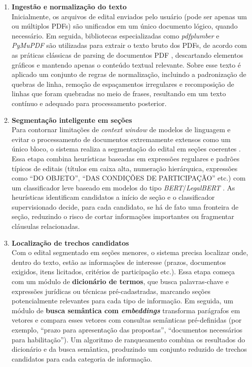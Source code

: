 \begin{enumerate}
    \item \textbf{Ingestão e normalização do texto}\\
    Inicialmente, os arquivos de edital enviados pelo usuário (pode ser apenas um ou múltiplos PDFs) são unificados em um único documento lógico, quando necessário. Em seguida, bibliotecas especializadas como \textit{pdfplumber} e \textit{PyMuPDF} são utilizadas para extrair o texto bruto dos PDFs, de acordo com as práticas clássicas de parsing de documentos PDF \cite{hassan2016pdfparsing}, descartando elementos gráficos e mantendo apenas o conteúdo textual relevante. Sobre esse texto é aplicado um conjunto de regras de normalização, incluindo a padronização de quebras de linha, remoção de espaçamentos irregulares e recomposição de linhas que foram quebradas no meio de frases, resultando em um texto contínuo e adequado para processamento posterior.

    \item \textbf{Segmentação inteligente em seções}\\
    Para contornar limitações de \textit{context window} de modelos de linguagem \cite{beltagy2020longformer} e evitar o processamento de documentos extremamente extensos como um único bloco, o sistema realiza a segmentação do edital em seções coerentes \cite{utiyama2001segmentation}. Essa etapa combina heurísticas baseadas em expressões regulares e padrões típicos de editais (títulos em caixa alta, numeração hierárquica, expressões como ``DO OBJETO'', ``DAS CONDIÇÕES DE PARTICIPAÇÃO'' etc.) com um classificador leve baseado em modelos do tipo \textit{BERT}/\textit{LegalBERT} \cite{devlin_bert_2019, chalkidis_legalbert_2020}. As heurísticas identificam candidatos a início de seção e o classificador supervisionado decide, para cada candidato, se há de fato uma fronteira de seção, reduzindo o risco de cortar informações importantes ou fragmentar cláusulas relacionadas.

    \item \textbf{Localização de trechos candidatos}\\
    Com o edital segmentado em seções menores, o sistema precisa localizar onde, dentro do texto, estão as informações de interesse (prazos, documentos exigidos, itens licitados, critérios de participação etc.). Essa etapa começa com um módulo de \textbf{dicionário de termos}, que busca palavras-chave e expressões jurídicas ou técnicas pré-cadastradas, marcando seções potencialmente relevantes para cada tipo de informação. Em seguida, um módulo de \textbf{busca semântica com \textit{embeddings}} transforma parágrafos em vetores e compara esses vetores com consultas semânticas pré-definidas (por exemplo, ``prazo para apresentação das propostas'', ``documentos necessários para habilitação''). Um algoritmo de ranqueamento combina os resultados do dicionário e da busca semântica, produzindo um conjunto reduzido de trechos candidatos para cada categoria de informação.


\end{enumerate}
